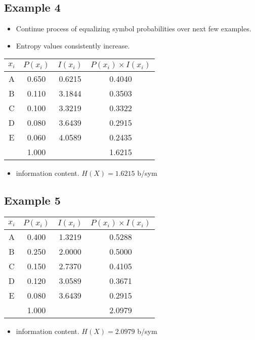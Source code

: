 \documentclass[a4paper,12pt]{article}
\begin{document}
			\subsection*{Example 4}
			\begin{itemize}
				\item Continue process of equalizing symbol probabilities over next few examples. 
				\item Entropy values consistently increase. 
			\end{itemize}
			\begin{center}\begin{tabular}{|c||c|c|c|}
					\hline
					\phantom{spa}  $x_i$	\phantom{spa} &	\phantom{spa}$P(x_i)$	\phantom{spa}&		\phantom{spa}$I(x_i)$\phantom{spa}&		$P(x_i) \times I(x_i)$	\\ \hline	\hline
					A	&	0.650	&	0.6215	&	0.4040	\\ \hline	
					B	&	0.110	&	3.1844	&	0.3503	\\ \hline	
					C	&	0.100	&	3.3219	&	0.3322	\\ \hline	
					D	&	0.080	&	3.6439	&	0.2915	\\ \hline	
					E	&	0.060	&	4.0589	&	0.2435	\\ \hline		\hline
					&	1.000	&		&	1.6215	\\ \hline
				\end{tabular}  \end{center}
				\begin{itemize}
					\item information content. $H(X) = 1.6215 $ b/sym
				\end{itemize}
				\subsection*{Example 5}
				\begin{center}\begin{tabular}{|c||c|c|c|}
						\hline
						\phantom{spa}  $x_i$	\phantom{spa} &	\phantom{spa}$P(x_i)$	\phantom{spa}&		\phantom{spa}$I(x_i)$\phantom{spa}&		$P(x_i) \times I(x_i)$	\\ \hline	\hline
						A	&	0.400	&	1.3219	&	0.5288	\\ \hline	
						B	&	0.250	&	2.0000	&	0.5000	\\ \hline	
						C	&	0.150	&	2.7370	&	0.4105	\\ \hline	
						D	&	0.120	&	3.0589	&	0.3671	\\ \hline	
						E	&	0.080	&	3.6439	&	0.2915	\\ \hline		\hline
						&	1.000	&		&	2.0979	\\ \hline
					\end{tabular}  \end{center}
					\begin{itemize}
						\item information content. $H(X) = 2.0979 $ b/sym
					\end{itemize}
\end{document}
